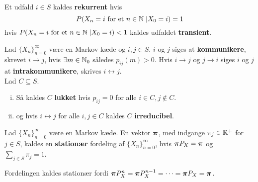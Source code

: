 \begin{defn}
Et udfald $i \in S$ kaldes \textbf{rekurrent} hvis 
\begin{equation*}
    P(X_n = i \text{ for et } n \in \mathbb{N} \;| X_0 = i) = 1
\end{equation*}
hvis $P(X_n = i \text{ for et } n \in \mathbb{N} \;| X_0 = i) < 1$ kaldes udfaldet \textbf{transient}.
\end{defn}

\begin{defn}
Lad $\{X_n\}_{n = 0}^\infty$ være en Markov kæde og $i, j \in S$. $i$ og $j$ siges at \textbf{kommunikere}, skrevet $i \to j$, hvis $\exists m \in \mathbb{N}_0$ således $p_{ij}(m) > 0$. Hvis $i \to j$ og $j \to i$ siges $i$ og $j$ at \textbf{intrakommunikere}, skrives $i \leftrightarrow j$.\\ Lad $C \subseteq S$.
\begin{enumerate}[i)]
    \item Så kaldes $C$ \textbf{lukket} hvis $p_{ij} = 0$ for alle $i \in C, j \not \in C$. 
    \item og hvis  $i \leftrightarrow j$ for alle $i, j \in C$ kaldes $C$ \textbf{irreducibel}.
\end{enumerate}
\end{defn}

\begin{defn}
Lad $\{X_n\}_{n = 0}^\infty$ være en Markov kæde. En vektor $\boldsymbol{\pi}$, med indgange $\pi_j \in \mathbb{R}^+$ for $j \in S$, kaldes en \textbf{stationær} fordeling af $\{X_n\}_{n = 0}^\infty$, hvis $\boldsymbol{\pi}P_X = \boldsymbol{\pi}$ og $\displaystyle \sum_{j \in S} \pi_j = 1$.
\end{defn}
Fordelingen kaldes stationær fordi $\boldsymbol{\pi} P_X^n = \boldsymbol{\pi} P_X^{n - 1} = \cdots = \boldsymbol{\pi} P_X = \boldsymbol{\pi}$.


